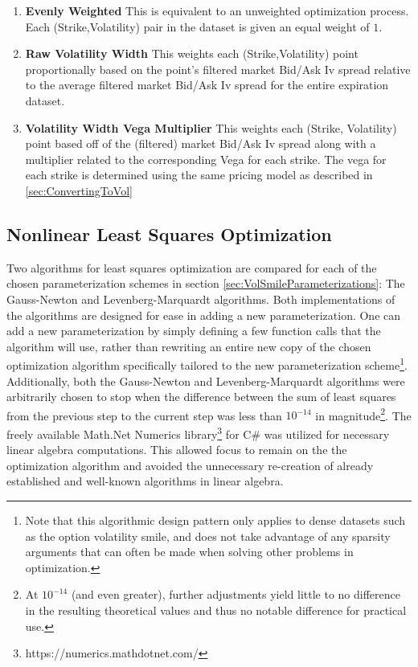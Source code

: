 \documentclass[12pt, a4paper, notitlepage]{article}
\numberwithin{equation}{subsection}
\numberwithin{figure}{subsection}
\numberwithin{table}{subsection}
\newcommand{\newpar}{\newline \newline}
\begin{document}
\begin{enumerate}
	\item \textbf{Evenly Weighted} \newline This is equivalent to an unweighted optimization process.  Each (Strike,Volatility) pair in the dataset is given an equal weight of $1$.
    \item \textbf{Raw Volatility Width} \newline This weights each (Strike,Volatility) point proportionally based on the point's filtered market Bid/Ask Iv spread relative to the average filtered market Bid/Ask Iv spread for the entire expiration dataset.
    \item \textbf{Volatility Width Vega Multiplier} \newline This weights each (Strike, Volatility) point based off of the (filtered) market Bid/Ask Iv spread along with a multiplier related to the corresponding Vega for each strike.  The vega for each strike is determined using the same pricing model as described in \ref{sec:ConvertingToVol}
\end{enumerate}

\subsection{Nonlinear Least Squares Optimization}
Two algorithms for least squares optimization are compared for each of the chosen parameterization schemes in section \ref{sec:VolSmileParameterizations}:  The Gauss-Newton and Levenberg-Marquardt algorithms.  Both implementations of the algorithms are designed for ease in adding a new parameterization.  One can add a new parameterization by simply defining a few function calls that the algorithm will use, rather than rewriting an entire new copy of the chosen optimization algorithm specifically tailored to the new parameterization scheme\footnote{Note that this algorithmic design pattern only applies to dense datasets such as the option volatility smile, and does not take advantage of any sparsity arguments that can often be made when solving other problems in optimization.}.  Additionally, both the Gauss-Newton and Levenberg-Marquardt algorithms were arbitrarily chosen to stop when the difference between the sum of least squares from the previous step to the current step was less than $10^{-14}$ in magnitude\footnote{At $10^{-14}$ (and even greater), further adjustments yield little to no difference in the resulting theoretical values and thus no notable difference for practical use.}.
\newpar
The freely available Math.Net Numerics library\footnote{https://numerics.mathdotnet.com/} for C\# was utilized for necessary linear algebra computations.  This allowed focus to remain on the the optimization algorithm and avoided the unnecessary re-creation of already established and well-known algorithms in linear algebra.
\end{document}
